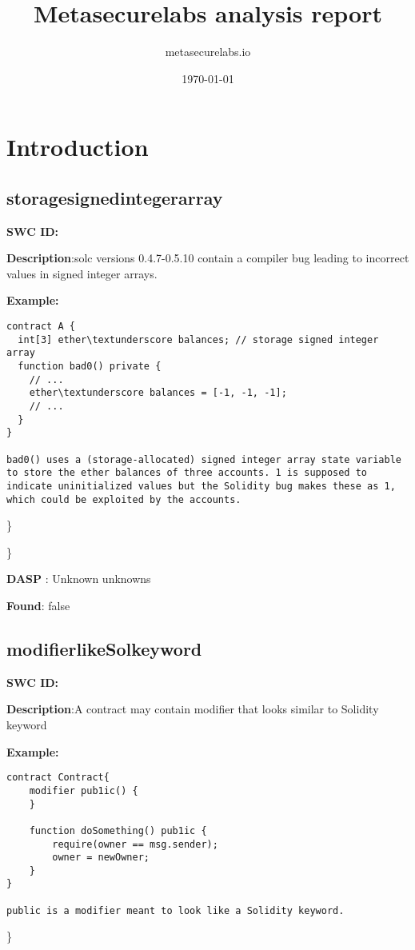 \documentclass{article}
\title{Metasecurelabs analysis report}
\author{metasecurelabs.io }
\date{\today}
\begin{document}
 

\maketitle 

\section{Introduction} 
\subsection{storage\textunderscore signed\textunderscore integer\textunderscore array} 
\textbf{SWC \textunderscore ID:} 

\textbf{Description}:solc versions 0.4.7-0.5.10 contain a compiler bug leading to incorrect values in signed integer arrays.


\textbf{Example:} 
\begin{verbatim}
contract A {
  int[3] ether\textunderscore balances; // storage signed integer array
  function bad0() private {
    // ...
    ether\textunderscore balances = [-1, -1, -1];
    // ...
  }
}

bad0() uses a (storage-allocated) signed integer array state variable to store the ether balances of three accounts. 1 is supposed to indicate uninitialized values but the Solidity bug makes these as 1, which could be exploited by the accounts.

\end{verbatim}\} 

\} 

\textbf{DASP} : Unknown unknowns

\textbf{Found}: false

\subsection{modifier\textunderscore like\textunderscore Sol\textunderscore keyword} 
\textbf{SWC \textunderscore ID:} 

\textbf{Description}:A contract may contain modifier that looks similar to Solidity keyword


\textbf{Example:} 
\begin{verbatim}
contract Contract{
    modifier pub1ic() {
    }

    function doSomething() pub1ic {
        require(owner == msg.sender);
        owner = newOwner;
    }
}

public is a modifier meant to look like a Solidity keyword.

\end{verbatim}\} 
\end{document}
